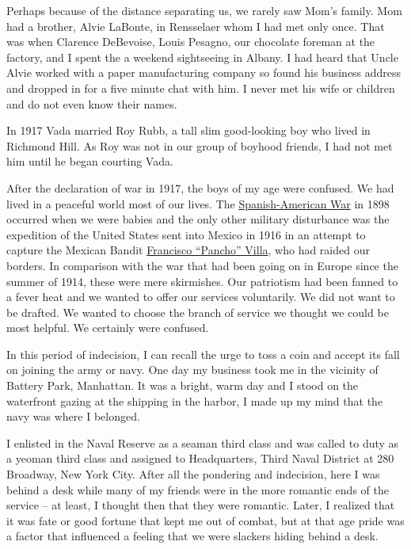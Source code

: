 \documentclass[12pt]{book}              %
\begin{document}
Perhaps because of the distance separating us, we rarely saw Mom's family. Mom had a brother, Alvie LaBonte, in Rensselaer whom I had met only once. That was when Clarence DeBevoise, Louis Pesagno, our chocolate foreman at the factory, and I spent the a weekend sightseeing in Albany. I had heard that Uncle Alvie worked with a paper manufacturing company so found his business address and dropped in for a five minute chat with him. I never met his wife or children and do not even know their names.

In 1917 Vada married Roy Rubb, a tall slim good-looking boy who lived in Richmond Hill. As Roy was not in our group of boyhood friends, I had not met him until he began courting Vada.

After the declaration of war in 1917, the boys of my age were confused. We had lived in a peaceful world most of our lives. The \href{http://en.wikipedia.org/wiki/Spanish-American_War}{Spanish-American War} in 1898 occurred when we were babies and the only other military disturbance was the expedition of the United States sent into Mexico in 1916 in an attempt to capture the Mexican Bandit \href{http://en.wikipedia.org/wiki/Pancho_Villa}{Francisco ``Pancho'' Villa}, who had raided our borders. In comparison with the war that had been going on in Europe since the summer of 1914, these were mere skirmishes. Our patriotism had been fanned to a fever heat and we wanted to offer our services voluntarily. We did not want to be drafted. We wanted to choose the branch of service we thought we could be most helpful. We certainly were confused. 

In this period of indecision, I can recall the urge to toss a coin and accept its fall on joining the army or navy. One day my business took me in the vicinity of Battery Park, Manhattan. It was a bright, warm day and I stood on the waterfront gazing at the shipping in the harbor, I made up my mind that the navy was where I belonged. 

I enlisted in the Naval Reserve as a seaman third class and was called to duty as a yeoman third class and assigned to Headquarters, Third Naval District at 280 Broadway, New York City. After all the pondering and indecision, here I was behind a desk while many of my friends were in the more romantic ends of the service -- at least, I thought then that they were romantic. Later, I realized that it was fate or good fortune that kept me out of combat, but at that age pride was a factor that influenced a feeling that we were slackers hiding behind a desk.
\end{document}
